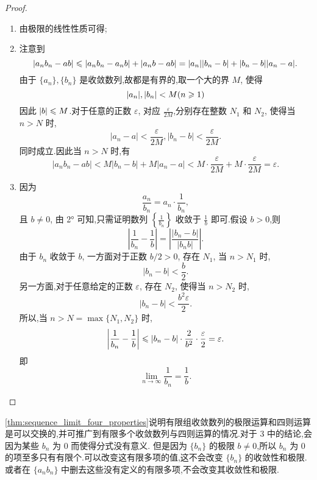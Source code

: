 \begin{proof}
    \begin{enumerate}
        \item 由极限的线性性质可得;
        \item 注意到
              $$
                  |a_n b_n - ab| \leqslant |a_n b_n - a_n b| + |a_n b - ab| = |a_n| |b_n - b| + |b_n - b| |a_n - a|.
              $$
              由于 $\{a_n\}, \{b_n\}$ 是收敛数列,故都是有界的,取一个大的界 $M$, 使得
              $$
                  |a_n|, |b_n| < M (n \geqslant 1)
              $$
              因此 $|b| \leqslant M$.对于任意的正数 $\varepsilon$, 对应 $\frac{\varepsilon}{2M}$,分别存在整数 $N_1$ 和 $N_2$, 使得当 $n > N$ 时,
              $$
                  |a_n - a| < \frac{\varepsilon}{2M}, |b_n - b| < \frac{\varepsilon}{2M}.
              $$
              同时成立.因此当 $n > N$ 时,有
              $$
                  |a_n b_n - ab| < M |b_n - b| + M |a_n - a| < M \cdot \frac{\varepsilon}{2M} + M \cdot \frac{\varepsilon}{2M} = \varepsilon.
              $$
        \item 因为
              $$
                  \frac{a_n}{b_n} = a_n \cdot \frac{1}{b_n},
              $$
              且 $b \neq 0$, 由 2° 可知,只需证明数列 $\left\{\frac{1}{b_n}\right\}$ 收敛于 $\frac{1}{b}$ 即可.假设 $b > 0$,则
              $$
                  \left| \frac{1}{b_n} - \frac{1}{b} \right| = \left| \frac{|b_n - b|}{|b_n b|} \right|.
              $$
              由于 $b_n$ 收敛于 $b$, 一方面对于正数 $b/2 > 0$, 存在 $N_1$, 当 $n > N_1$ 时,
              $$
                  |b_n - b| < \frac{b}{2}.
              $$
              另一方面,对于任意给定的正数 $\varepsilon$, 存在 $N_2$, 使得当 $n > N_2$ 时,
              $$
                  |b_n - b| < \frac{b^2 \varepsilon}{2}.
              $$
              所以,当 $n > N = \max\{N_1, N_2\}$ 时,
              $$
                  \left| \frac{1}{b_n} - \frac{1}{b} \right| \leqslant |b_n - b| \cdot \frac{2}{b^2} \cdot \frac{\varepsilon}{2} = \varepsilon.
              $$
              即
              $$
                  \lim_{n \to \infty} \frac{1}{b_n} = \frac{1}{b}.
              $$
    \end{enumerate}
\end{proof}

\autoref{thm:sequence_limit_four_properties}说明有限组收敛数列的极限运算和四则运算是可以交换的,并可推广到有限多个收敛数列与四则运算的情况.对于 3 中的结论,会因为某些 $b_n$ 为 $0$ 而使得分式没有意义. 但是因为 $\{b_n\}$ 的极限 $b \neq 0$,所以 $b_n$ 为 $0$ 的项至多只有有限个.可以改变这有限多项的值,这不会改变 $\{b_n\}$ 的收敛性和极限.或者在 $\{a_n b_n\}$ 中删去这些没有定义的有限多项,不会改变其收敛性和极限.

